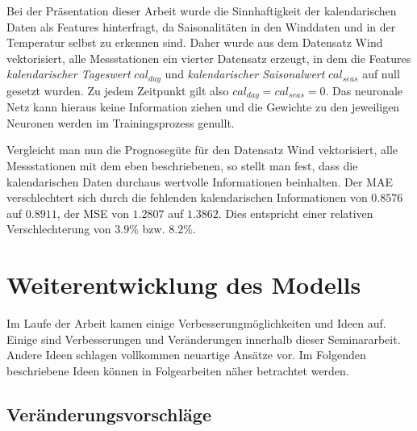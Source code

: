 \documentclass[
12pt, %
toc=listofnumbered, %
toc=chapterentrydotfill, %
numbers=noenddot, %
captions=tableheading, %
bibliography=numbered
]{scrreprt}
\let\Oldsection\section
\renewcommand{\section}{\FloatBarrier\Oldsection}
\let\Oldsubsection\subsection
\renewcommand{\subsection}{\FloatBarrier\Oldsubsection}
\newcommand{\qm}[1]{\glqq#1\grqq{}} %
\begin{document}
Bei der Präsentation dieser Arbeit wurde die Sinnhaftigkeit der kalendarischen Daten als Features hinterfragt, da Saisonalitäten in den Winddaten und in der Temperatur selbst zu erkennen sind. Daher wurde aus dem Datensatz \qm{Wind vektorisiert, alle Messstationen} ein vierter Datensatz erzeugt, in dem die Features \textit{kalendarischer Tageswert} $cal_{day}$ und \textit{kalendarischer Saisonalwert} $cal_{seas}$ auf null gesetzt wurden. Zu jedem Zeitpunkt gilt also $cal_{day} = cal_{seas} = 0$. Das neuronale Netz kann hieraus keine Information ziehen und die Gewichte zu den jeweiligen Neuronen werden im Trainingsprozess \qm{genullt}.

Vergleicht man nun die Prognosegüte für den Datensatz \qm{Wind vektorisiert, alle Messstationen} mit dem eben beschriebenen, so stellt man fest, dass die kalendarischen Daten durchaus wertvolle Informationen beinhalten. Der MAE verschlechtert sich durch die fehlenden kalendarischen Informationen von $0.8576$ auf $0.8911$, der MSE von $1.2807$ auf $1.3862$. Dies entspricht einer relativen Verschlechterung von $3.9\%$ bzw. $8.2\%$.


\section{Weiterentwicklung des Modells}

Im Laufe der Arbeit kamen einige Verbesserungmöglichkeiten und Ideen auf. Einige sind Verbesserungen und Veränderungen innerhalb dieser Seminararbeit. 
Andere Ideen schlagen vollkommen neuartige Ansätze vor. Im Folgenden beschriebene Ideen können in Folgearbeiten näher betrachtet werden.

\subsection{Veränderungsvorschläge}
\end{document}
